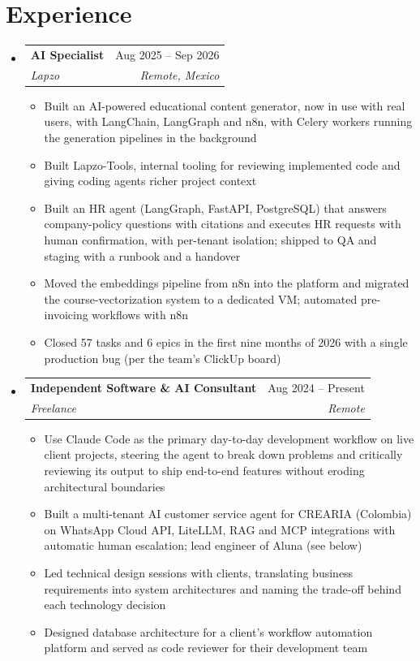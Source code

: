 \documentclass[letterpaper,10pt]{article}
\makeatletter
\newcommand{\resumeSubheading}[4]{
  \vspace{-2pt}
  \item[]
  \begin{tabular*}{\textwidth}{@{\extracolsep{\fill}}l r}
    \textbf{#1} & #2 \\
    \textit{#3} & \textit{#4} \\
  \end{tabular*}
  \vspace{-5pt}
}
\makeatother
\begin{document}
\section{Experience}
\begin{itemize}[leftmargin=0pt, itemindent=0pt, label={}, itemsep=1pt]
\resumeSubheading
{AI Specialist}{Aug 2025 -- Sep 2026}
{Lapzo}{Remote, Mexico}
\begin{itemize}[leftmargin=*, itemsep=0pt]
    \item Built an AI-powered educational content generator, now in use with real users, with LangChain, LangGraph and n8n, with Celery workers running the generation pipelines in the background
    \item Built Lapzo-Tools, internal tooling for reviewing implemented code and giving coding agents richer project context
    \item Built an HR agent (LangGraph, FastAPI, PostgreSQL) that answers company-policy questions with citations and executes HR requests with human confirmation, with per-tenant isolation; shipped to QA and staging with a runbook and a handover
    \item Moved the embeddings pipeline from n8n into the platform and migrated the course-vectorization system to a dedicated VM; automated pre-invoicing workflows with n8n
    \item Closed 57 tasks and 6 epics in the first nine months of 2026 with a single production bug (per the team's ClickUp board)
\end{itemize}
\resumeSubheading
{Independent Software \& AI Consultant}{Aug 2024 -- Present}
{Freelance}{Remote}
\begin{itemize}[leftmargin=*, itemsep=0pt]
    \item Use Claude Code as the primary day-to-day development workflow on live client projects, steering the agent to break down problems and critically reviewing its output to ship end-to-end features without eroding architectural boundaries
    \item Built a multi-tenant AI customer service agent for CREARIA (Colombia) on WhatsApp Cloud API, LiteLLM, RAG and MCP integrations with automatic human escalation; lead engineer of Aluna (see below)
    \item Led technical design sessions with clients, translating business requirements into system architectures and naming the trade-off behind each technology decision
    \item Designed database architecture for a client's workflow automation platform and served as code reviewer for their development team

\end{itemize}
\end{itemize}
\end{document}
